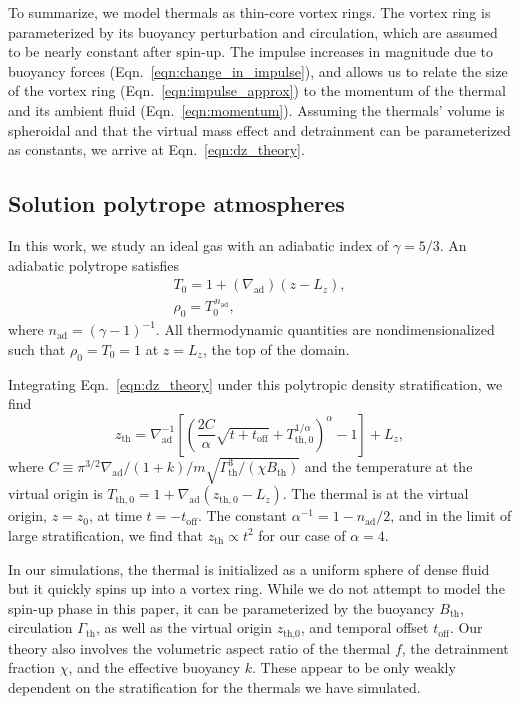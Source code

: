 \documentclass[twocolumn, amsmath, amsfonts, amssymb, trackchanges]{aastex62}
\newcommand{\grad}{\ensuremath{\nabla}}
\begin{document}
To summarize, we model thermals as thin-core vortex rings.
The vortex ring is parameterized by its buoyancy perturbation and circulation, which are assumed to be nearly constant after spin-up.
The impulse increases in magnitude due to buoyancy forces (Eqn.~\ref{eqn:change_in_impulse}), and allows us to relate the size of the vortex ring (Eqn.~\ref{eqn:impulse_approx}) to the momentum of the thermal and its ambient fluid (Eqn.~\ref{eqn:momentum}).
Assuming the thermals' volume is spheroidal and that the virtual mass effect and detrainment can be parameterized as constants, we arrive at Eqn.~\ref{eqn:dz_theory}.

\subsection{Solution polytrope atmospheres}
In this work, we study an ideal gas with an adiabatic index of $\gamma = 5/3$.
An adiabatic polytrope satisfies
\begin{gather}\label{eqn:T0}
T_0 = 1 + (\grad_{\text{ad}})(z - L_z), \\
\rho_0 = T_0^{\,n_{\text{ad}}},
\label{eqn:polytrope}
\end{gather}
where $n_{\text{ad}} = (\gamma-1)^{-1}$.
All thermodynamic quantities are nondimensionalized such that $\rho_0 = T_0 = 1$ at $z = L_z$, the top of the domain.

Integrating Eqn.~\ref{eqn:dz_theory} under this polytropic density stratification, we find
\begin{equation}
z_{\text{th}} = \grad_{\text{ad}}^{-1}\left[\left(\frac{2C}{ \alpha } \sqrt{t + t_{\text{off}}} + T_{\text{th},0}^{1/\alpha}  \right)^{\alpha} - 1\right] + L_z,
\label{eqn:theory_z}
\end{equation}
where $C \equiv \pi^{3/2} \grad_{\text{ad}} / (1 + k) / m \sqrt{\Gamma_{\text{th}}^3/(\chi B_{\text{th}})}$ and the temperature at the virtual origin is $T_{\text{th},0} = 1 + \grad_{\text{ad}}(z_{\text{th},0} - L_z)$.
The thermal is at the virtual origin, $z=z_0$, at time $t=-t_{\text{off}}$.
The constant $\alpha^{-1} = 1 - n_{\text{ad}}/2$, and in the limit of large stratification, we find that $z_{\text{th}} \propto t^2$ for our case of $\alpha = 4$. 

In our simulations, the thermal is initialized as a uniform sphere of dense fluid but it quickly spins up into a vortex ring. 
While we do not attempt to model the spin-up phase in this paper, it can be parameterized by the buoyancy $B_{\text{th}}$, circulation $\Gamma_{\text{th}}$, as well as the virtual origin $z_{\text{th,0}}$, and temporal offset $t_{\text{off}}$. 
Our theory also involves the volumetric aspect ratio of the thermal $f$, the detrainment fraction $\chi$, and the effective buoyancy $k$. 
These appear to be only weakly dependent on the stratification for the thermals we have simulated.
\end{document}

